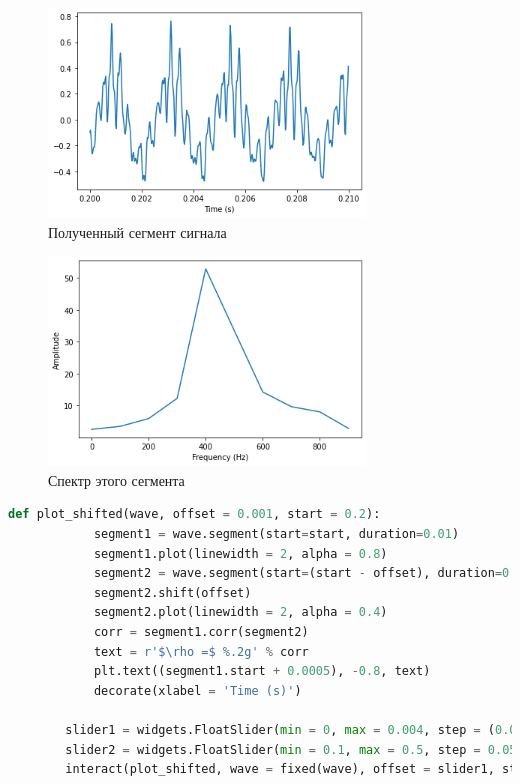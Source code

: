 \documentclass[a4paper, 12pt]{report}
\begin{document}
	\begin{figure}[H]
		\centering
		\includegraphics[width=0.75\textwidth]{acr3.png}
		\caption{Полученный сегмент сигнала}
		\label{fig:arc3}
	\end{figure}
	\begin{figure}[H]
		\centering
		\includegraphics[width=0.75\textwidth]{acr4.png}
		\caption{Спектр этого сегмента}
		\label{fig:arc4}
	\end{figure}
	\begin{lstlisting}[language=Python,caption=Функция для нахождения корреляции между сигналами]
		def plot_shifted(wave, offset = 0.001, start = 0.2):
			segment1 = wave.segment(start=start, duration=0.01)
			segment1.plot(linewidth = 2, alpha = 0.8)
			segment2 = wave.segment(start=(start - offset), duration=0.01)
			segment2.shift(offset)
			segment2.plot(linewidth = 2, alpha = 0.4)
			corr = segment1.corr(segment2)
			text = r'$\rho =$ %.2g' % corr
			plt.text((segment1.start + 0.0005), -0.8, text)
			decorate(xlabel = 'Time (s)')

		slider1 = widgets.FloatSlider(min = 0, max = 0.004, step = (0.004 / 40), value = 0)
		slider2 = widgets.FloatSlider(min = 0.1, max = 0.5, step = 0.05, value = 0.2)
		interact(plot_shifted, wave = fixed(wave), offset = slider1, start = slider2);
	\end{lstlisting}
\end{document}
